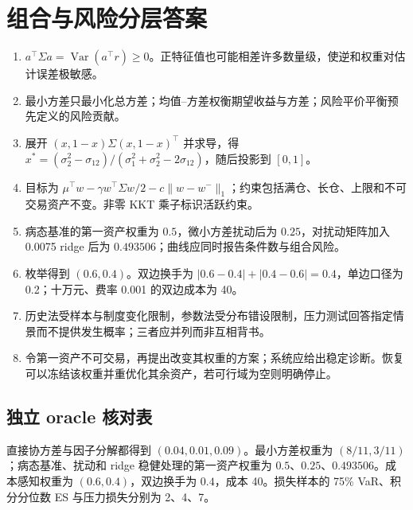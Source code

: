 \chapter{组合与风险分层答案}
\begin{enumerate}[leftmargin=*]
  \item $a^\top\Sigma a=\operatorname{Var}(a^\top r)\ge0$。正特征值也可能相差许多数量级，使逆和权重对估计误差极敏感。
  \item 最小方差只最小化总方差；均值--方差权衡期望收益与方差；风险平价平衡预先定义的风险贡献。
  \item 展开 $(x,1-x)\Sigma(x,1-x)^\top$ 并求导，得 $x^*=(\sigma_2^2-\sigma_{12})/(\sigma_1^2+\sigma_2^2-2\sigma_{12})$，随后投影到 $[0,1]$。
  \item 目标为 $\mu^\top w-\gamma w^\top\Sigma w/2-c\lVert w-w^-\rVert_1$；约束包括满仓、长仓、上限和不可交易资产不变。非零 KKT 乘子标识活跃约束。
  \item 病态基准的第一资产权重为 $0.5$，微小方差扰动后为 $0.25$，对扰动矩阵加入 0.0075 ridge 后为 $0.493506$；曲线应同时报告条件数与组合风险。
  \item 枚举得到 $(0.6,0.4)$。双边换手为 $|0.6-0.4|+|0.4-0.6|=0.4$，单边口径为 0.2；十万元、费率 0.001 的双边成本为 40。
  \item 历史法受样本与制度变化限制，参数法受分布错设限制，压力测试回答指定情景而不提供发生概率；三者应并列而非互相背书。
  \item 令第一资产不可交易，再提出改变其权重的方案；系统应给出稳定诊断。恢复可以冻结该权重并重优化其余资产，若可行域为空则明确停止。
\end{enumerate}

\section*{独立 oracle 核对表}
直接协方差与因子分解都得到 $(0.04,0.01,0.09)$。最小方差权重为 $(8/11,3/11)$；病态基准、扰动和 ridge 稳健处理的第一资产权重为 $0.5$、$0.25$、$0.493506$。成本感知权重为 $(0.6,0.4)$，双边换手为 $0.4$，成本 40。损失样本的 75\% VaR、积分分位数 ES 与压力损失分别为 2、4、7。
